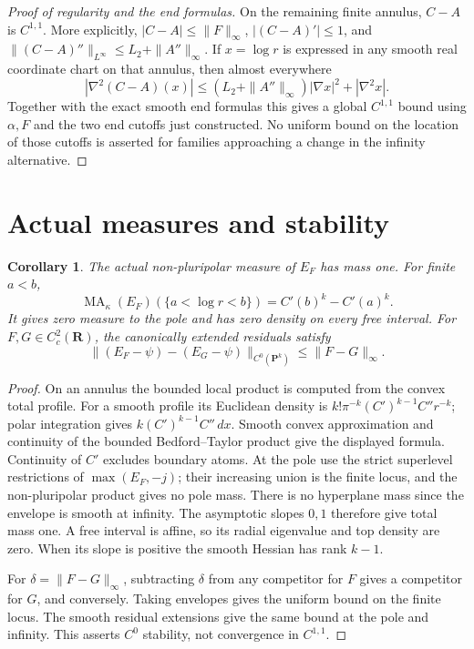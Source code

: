 \documentclass[11pt]{article}
\newcommand{\MA}{\operatorname{MA}}
\newtheorem{corollary}[theorem]{Corollary}
\theoremstyle{remark}\newtheorem{remark}[theorem]{Remark}
\begin{document}
\begin{proof}[Proof of regularity and the end formulas]
On the remaining finite annulus, $C-A$ is $C^{1,1}$. More explicitly,
$|C-A|\leq\|F\|_\infty$, $|(C-A)'|\leq1$, and
$\|(C-A)''\|_{L^\infty}\leq L_2+\|A''\|_\infty$.
If $x=\log r$ is expressed in any smooth real coordinate chart on that
annulus, then almost everywhere
\[
 |\nabla^2(C-A)(x)|\leq
 (L_2+\|A''\|_\infty)|\nabla x|^2+|\nabla^2x|.
\]
Together with the exact smooth end formulas this gives a global
$C^{1,1}$ bound using $\alpha,F$ and the two end cutoffs just constructed.
No uniform bound on the location of those cutoffs is asserted for
families approaching a change in the infinity alternative.
\end{proof}

\section{Actual measures and stability}
\begin{corollary}\label{cor:mass}
The actual non-pluripolar measure of $E_F$ has mass one. For finite
$a<b$,
\[
 \MA_\kappa(E_F)(\{a<\log r<b\})=C'(b)^k-C'(a)^k.
\]
It gives zero measure to the pole and has zero density on every free
interval. For $F,G\in C_c^2(\mathbf R)$, the canonically extended
residuals satisfy
\[
 \|(E_F-\psi)-(E_G-\psi)\|_{C^0(\mathbf P^k)}
       \leq\|F-G\|_\infty.
\]
\end{corollary}
\begin{proof}
On an annulus the bounded local product is computed from the convex
total profile. For a smooth profile its Euclidean density is
$k!\pi^{-k}(C')^{k-1}C''r^{-k}$; polar integration gives
$k(C')^{k-1}C''\,dx$. Smooth convex approximation and continuity of
the bounded Bedford--Taylor product give the displayed formula.
Continuity of $C'$ excludes boundary atoms. At the pole use the strict
superlevel restrictions of $\max(E_F,-j)$; their increasing union is
the finite locus, and the non-pluripolar product gives no pole mass.
There is no hyperplane mass since the envelope is smooth at infinity.
The asymptotic slopes $0,1$ therefore give total mass one. A free
interval is affine, so its radial eigenvalue and top density are zero.
When its slope is positive the smooth Hessian has rank $k-1$.

For $\delta=\|F-G\|_\infty$, subtracting $\delta$ from any competitor
for $F$ gives a competitor for $G$, and conversely. Taking envelopes
gives the uniform bound on the finite locus. The smooth residual
extensions give the same bound at the pole and infinity. This asserts
$C^0$ stability, not convergence in $C^{1,1}$.
\end{proof}
\end{document}
